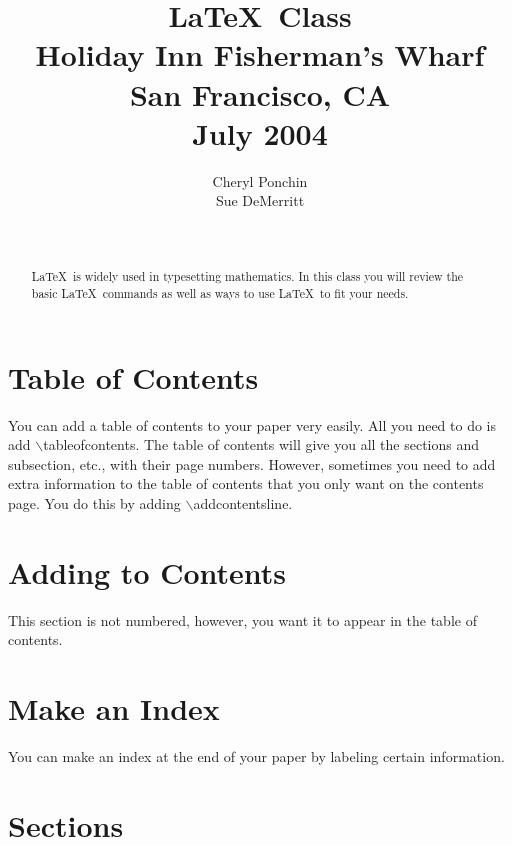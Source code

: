 \documentclass[12pt]{article}   %
\title{\LaTeX\ Class \\ 
Holiday Inn Fisherman's Wharf\\ San Francisco, CA\\ July 2004}        %
\author{Cheryl Ponchin\\ Sue DeMerritt}  %
\date{\ }
\theoremstyle{plain}
\begin{document}
%



\maketitle                 %

\large
\newpage


\tableofcontents
\newpage

\begin{abstract}
\large
\LaTeX\ is widely used in typesetting mathematics.  In this class you will review the basic \LaTeX\ commands as well as ways to use \LaTeX\ to fit your needs.
\end{abstract}

\newpage
{}

\section{Table of Contents}
\label{sec:toc}
 
You can add a table of contents to your paper very easily.  All you need to do is add $\backslash$tableofcontents.  The table of contents will give you all the sections and subsection, etc., with their page numbers.  However, sometimes you need to add extra information to the table of contents that you only want on the contents page.  You do this by adding $\backslash$addcontentsline.

\section*{Adding to Contents}
This section is not numbered, however, you want it to appear in the table of contents.

\section{Make an Index}\label{sec:index}

You can make an index at the end of your paper by labeling certain information.

\section{Sections}\label{sec:sections}  
\end{document}
